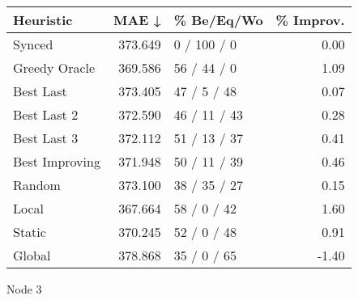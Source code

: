 \begin{tabular}{lrlr}
\toprule
\textbf{Heuristic} & \textbf{MAE ↓} & \textbf{\% Be/Eq/Wo} & \textbf{\% Improv.} \\
\midrule
            Synced &        373.649 &          0 / 100 / 0 &                0.00 \\
     Greedy Oracle &        369.586 &          56 / 44 / 0 &                1.09 \\
         Best Last &        373.405 &          47 / 5 / 48 &                0.07 \\
       Best Last 2 &        372.590 &         46 / 11 / 43 &                0.28 \\
       Best Last 3 &        372.112 &         51 / 13 / 37 &                0.41 \\
    Best Improving &        371.948 &         50 / 11 / 39 &                0.46 \\
            Random &        373.100 &         38 / 35 / 27 &                0.15 \\
             Local &        367.664 &          58 / 0 / 42 &                1.60 \\
            Static &        370.245 &          52 / 0 / 48 &                0.91 \\
            Global &        378.868 &          35 / 0 / 65 &               -1.40 \\
\bottomrule
\end{tabular}
\caption{Node 3}
\label{tab:non_lr05_le1_bs4_3}

